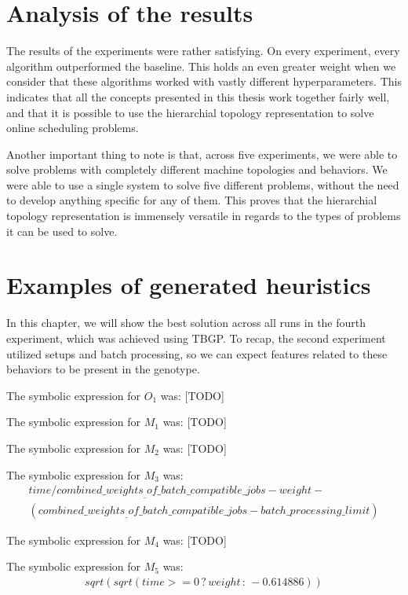 \section{Analysis of the results}

The results of the experiments were rather satisfying. On every experiment, every algorithm outperformed the baseline. This holds an even greater weight when we consider that these algorithms worked with vastly different hyperparameters. This indicates that all the concepts presented in this thesis work together fairly well, and that it is possible to use the hierarchial topology representation to solve online scheduling problems.

Another important thing to note is that, across five experiments, we were able to solve problems with completely different machine topologies and behaviors. We were able to use a single system to solve five different problems, without the need to develop anything specific for any of them. This proves that the hierarchial topology representation is immensely versatile in regards to the types of problems it can be used to solve.

\section{Examples of generated heuristics}

In this chapter, we will show the best solution across all runs in the fourth experiment, which was achieved using TBGP. To recap, the second experiment utilized setups and batch processing, so we can expect features related to these behaviors to be present in the genotype.

The symbolic expression for $O_1$ was:
[TODO]

The symbolic expression for $M_1$ was:
[TODO]

The symbolic expression for $M_2$ was:
[TODO]

The symbolic expression for $M_3$ was:
\begin{gather*}
    time / combined\_weights_\_of\_batch\_compatible\_jobs - weight - \\
    (combined\_weights_\_of\_batch\_compatible\_jobs - batch\_processing\_limit)
\end{gather*}

The symbolic expression for $M_4$ was:
[TODO]

The symbolic expression for $M_5$ was:
\begin{gather*}
    sqrt(sqrt(time >= 0\,?\,weight\,:\,-0.614886))
\end{gather*}
